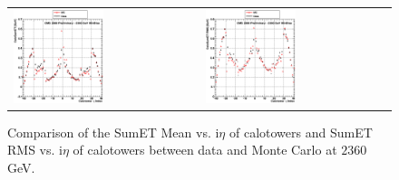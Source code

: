 \begin{figure}[h!]
 \centering
 \begin{tabular}{ll}
  \includegraphics[width=0.5\textwidth]{plots_DataVsMC_MB_2360GeV/g_caloSumetMean_vs_ieta_2360.eps} &
  \includegraphics[width=0.5\textwidth]{plots_DataVsMC_MB_2360GeV/g_caloSumetRMS_vs_ieta_2360.eps} \\
 \end{tabular}
 \caption{\small Comparison of the SumET Mean vs. i$\eta$ of calotowers and SumET RMS vs. i$\eta$ of calotowers between 
          data and Monte Carlo at $2360$ GeV.\label{fig:SumET_MeanRMS_vs_ieta_2360}}
\end{figure}

